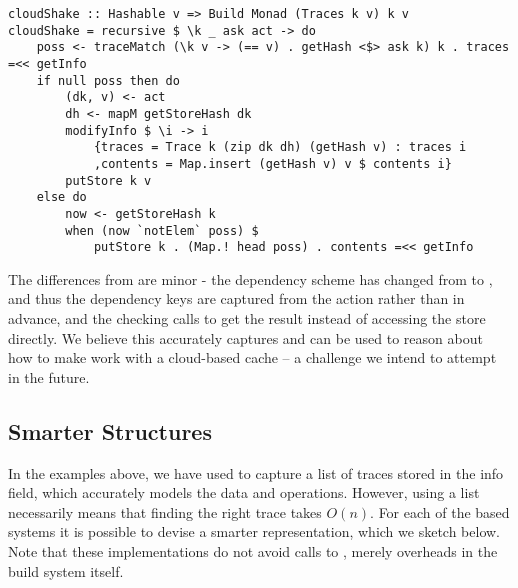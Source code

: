 \begin{verbatim}
cloudShake :: Hashable v => Build Monad (Traces k v) k v
cloudShake = recursive $ \k _ ask act -> do
    poss <- traceMatch (\k v -> (== v) . getHash <$> ask k) k . traces =<< getInfo
    if null poss then do
        (dk, v) <- act
        dh <- mapM getStoreHash dk
        modifyInfo $ \i -> i
            {traces = Trace k (zip dk dh) (getHash v) : traces i
            ,contents = Map.insert (getHash v) v $ contents i}
        putStore k v
    else do
        now <- getStoreHash k
        when (now `notElem` poss) $
            putStore k . (Map.! head poss) . contents =<< getInfo
\end{verbatim}

The differences from  are minor - the dependency scheme has changed from  to , and thus the dependency keys  are captured from the action rather than in advance, and the checking calls  to get the result instead of accessing the store directly. We believe this accurately captures and can be used to reason about how to make \Shake work with a cloud-based cache -- a challenge we intend to attempt in the future.

\subsection{Smarter \hs{[Trace]} Structures}\label{sec-smart-traces}

In the examples above, we have used \hs{[Trace]} to capture a list of traces stored in the info field, which accurately models the data and operations. However, using a list necessarily means that finding the right trace takes $O(n)$. For each of the  based systems it is possible to devise a smarter representation, which we sketch below. Note that these implementations do not avoid calls to , merely overheads in the build system itself.

